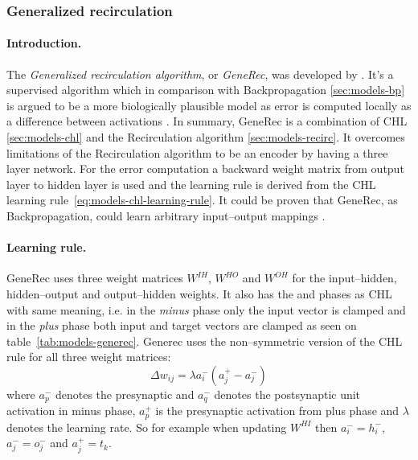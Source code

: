 \subsubsection{Generalized recirculation}
\label{sec:models-generec} 

\paragraph{Introduction.} 
The \emph{Generalized recirculation algorithm}, or \emph{GeneRec}, was developed by \citet{o1996bio}. It's a supervised algorithm which in comparison with Backpropagation \ref{sec:models-bp} is argued to be a more biologically plausible model as error is computed locally as a difference between activations \citep{o1998six, o2001generalization, da2011advances, schneider2009application}. In summary, GeneRec is a combination of CHL \ref{sec:models-chl} and the Recirculation algorithm \ref{sec:models-recirc}. It overcomes limitations of the Recirculation algorithm to be an encoder by having a three layer network. For the error computation a backward weight matrix from output layer to hidden layer is used and the learning rule is derived from the CHL learning rule~\ref{eq:models-chl-learning-rule}. It could be proven that GeneRec, as Backpropagation, could learn arbitrary input--output mappings \citep{o1996bio}. 

\paragraph{Learning rule.} 
\label{sec:models-generec-learning-rule} 
GeneRec uses three weight matrices $W^{IH}$, $W^{HO}$ and $W^{OH}$ for the input--hidden, hidden--output and output--hidden weights. It also has the \quotes{-} and \quotes{+} phases as CHL with same meaning, i.e. in the \emph{minus} phase only the input vector is clamped and in the \emph{plus} phase both input and target vectors are clamped as seen on table~\ref{tab:models-generec}. Generec uses the non--symmetric version of the CHL rule for all three weight matrices: 
\begin{equation}
  \label{eq:models-generec-learning-rule}
  \Delta w_{ij} = \lambda a^{-}_i(a^{+}_j - a^{-}_j)
\end{equation}
where $a^{-}_p$ denotes the presynaptic and $a^{-}_q$ denotes the postsynaptic unit activation in minus phase, $a^{+}_p$ is the presynaptic activation from plus phase and $\lambda$ denotes the learning rate. So for example when updating $W^{HI}$ then $a^{-}_i = h^{-}_i$, $a^{-}_j = o^{-}_j$ and $a^{+}_j = t_k$. 

